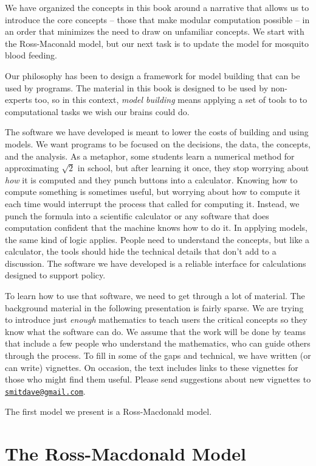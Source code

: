 \documentclass[
]{book}
\begin{document}
We have organized the concepts in this book around a narrative that allows us to introduce the core concepts -- those that make modular computation possible -- in an order that minimizes the need to draw on unfamiliar concepts. We start with the Ross-Maconald model, but our next task is to update the model for mosquito blood feeding.

Our philosophy has been to design a framework for model building that can be used by programs. The material in this book is designed to be used by non-experts too, so in this context, \emph{model building} means applying a set of tools to to computational tasks we wish our brains could do.

The software we have developed is meant to lower the costs of building and using models. We want programs to be focused on the decisions, the data, the concepts, and the analysis. As a metaphor, some students learn a numerical method for approximating \(\sqrt{2}\) in school, but after learning it once, they stop worrying about \emph{how} it is computed and they punch buttons into a calculator. Knowing how to compute something is sometimes useful, but worrying about how to compute it each time would interrupt the process that called for computing it. Instead, we punch the formula into a scientific calculator or any software that does computation confident that the machine knows how to do it. In applying models, the same kind of logic applies. People need to understand the concepts, but like a calculator, the tools should hide the technical details that don't add to a discussion. The software we have developed is a reliable interface for calculations designed to support policy.

To learn how to use that software, we need to get through a lot of material. The background material in the following presentation is fairly sparse. We are trying to introduce just \emph{enough} mathematics to teach users the critical concepts so they know what the software can do. We assume that the work will be done by teams that include a few people who understand the mathematics, who can guide others through the process. To fill in some of the gaps and technical, we have written (or can write) vignettes. On occasion, the text includes links to these vignettes for those who might find them useful. Please send suggestions about new vignettes to \href{mailto:smitdave@gmail.com}{\nolinkurl{smitdave@gmail.com}}.

The first model we present is a Ross-Macdonald model.

\hypertarget{the-ross-macdonald-model}{%
\chapter{The Ross-Macdonald Model}\label{the-ross-macdonald-model}}
\end{document}
